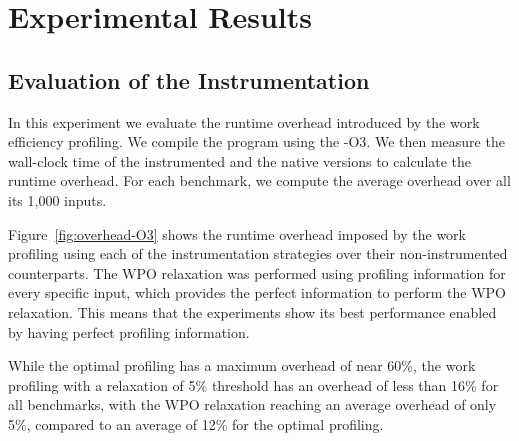 \section{Experimental Results}


\subsection{Evaluation of the Instrumentation}

In this experiment we evaluate the runtime overhead introduced by the work efficiency profiling. We compile the program using the
{\flagstype -O3}. We then measure the wall-clock time of the instrumented and the native versions to calculate the runtime overhead. For
each benchmark, we compute the average overhead over all its 1,000 inputs.

Figure~\ref{fig:overhead-O3} shows the runtime overhead imposed by the work profiling using each of the instrumentation strategies over
their non-instrumented counterparts. The WPO relaxation was performed using profiling information for every specific input, which provides
the perfect information to perform the WPO relaxation. This means that the experiments show its best performance enabled by having perfect
profiling information.


While the optimal profiling has a maximum overhead of near 60\%, the work profiling with a relaxation of 5\% threshold has an overhead of
less than 16\% for all benchmarks, with the WPO relaxation reaching an average overhead of only 5\%, compared to an average of 12\% for the
optimal profiling.

